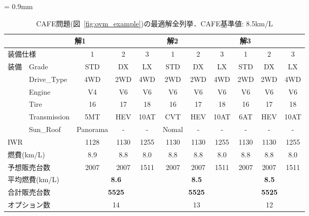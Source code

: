 \begin{table*}[htbp]
  \caption{CAFE問題(図~\ref{fig:ovm_example})の最適解全列挙．CAFE基準値: 8.5km/L}
  \centering
  \tabcolsep = 0.9mm
  \begin{tabular}{l|l|c|c|c||c|c|c||c|c|c} \bhline
    \multicolumn{2}{l|}{} & \multicolumn{3}{c||}{解1} & \multicolumn{3}{c||}{解2} & \multicolumn{3}{c}{\bf{解3}}\\ \hline
    \multicolumn{2}{l|}{装備仕様} & 1 & 2 & 3 & 1 & 2 & 3 & 1 & 2 & 3 \\ \hline
    装備 & \textsf{Grade}        & \textsf{STD}& \textsf{DX} & \textsf{LX}& \textsf{STD} & \textsf{DX}  & \textsf{LX}    & \textsf{STD} & \textsf{DX}  & \textsf{LX}       \\
        & \textsf{Drive\_Type}  & \textsf{4WD}  & \textsf{2WD} & \textsf{4WD} & \textsf{2WD} & \textsf{2WD} & \textsf{4WD} & \textsf{2WD} & \textsf{2WD} & \textsf{4WD}  \\
        & \textsf{Engine} & \textsf{V4} & \textsf{V6} & \textsf{V6} & \textsf{V6} & \textsf{V6} & \textsf{V6} & \textsf{V6} & \textsf{V6} & \textsf{V6}      \\ 
        & \textsf{Tire} & \textsf{16}	& \textsf{17} & \textsf{18} & \textsf{16}  & \textsf{17}  & \textsf{18} & \textsf{16} & \textsf{17} & \textsf{18} \\
        & \textsf{Transmission} & \textsf{5MT} & \textsf{HEV} & \textsf{10AT} & \textsf{CVT} & \textsf{HEV} & \textsf{10AT}  & \textsf{6AT} & \textsf{HEV} & \textsf{10AT}     \\
        & \textsf{Sun\_Roof} & \textsf{Panorama} & -   & -       & \textsf{Nomal} & -  & -     & -   & -   & -       \\ \hline
    \multicolumn{2}{l|}{IWR}  & 1128 & 1130   & 1255    & 1130 & 1130&1255  & 1130& 1130& 1255     \\ %
    \multicolumn{2}{l|}{燃費(km/L)}    & 8.9 & 8.8    & 8.0     & 8.8 & 8.8  & 8.0 & 8.8  & 8.8  & 8.0         \\ %
    \multicolumn{2}{l|}{予想販売台数}  & 2007  & 2007   & 1511   & 2007 & 2007 & 1511 & 2007& 2007& 1511       \\ \hline
    \multicolumn{2}{l|}{平均燃費(km/L)} & \multicolumn{3}{c||}{\bf{8.6}} & \multicolumn{3}{c||}{\bf{8.5}} & \multicolumn{3}{c}{\bf{8.5}}\\ 
    \multicolumn{2}{l|}{合計販売台数}  & \multicolumn{3}{c||}{\bf{5525}} & \multicolumn{3}{c||}{\bf{5525}}  &\multicolumn{3}{c}{\bf{5525}}\\
    \multicolumn{2}{l|}{オプション数}  & \multicolumn{3}{c||}{14} & \multicolumn{3}{c||}{13}  &\multicolumn{3}{c}{12}\\ \hline
  \end{tabular}
  \label{tab:optN}
\end{table*}

